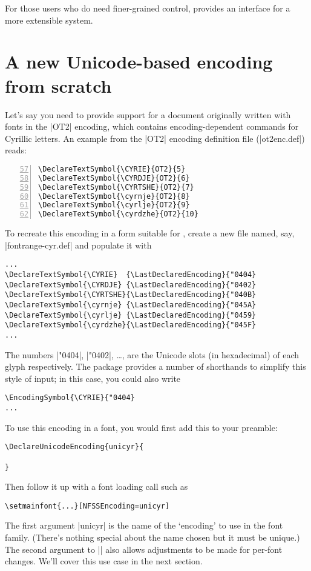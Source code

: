\documentclass[a4paper]{l3doc}
\begin{document}
For those users who do need finer-grained control,  provides an
interface for a more extensible system.


\section{A new Unicode-based encoding from scratch}

Let's say you need to provide support for a document originally written with fonts
in the |OT2| encoding, which contains encoding-dependent commands for Cyrillic letters.
An example from the |OT2| encoding definition file (|ot2enc.def|) reads:
\begin{Verbatim}[numbers=left,firstnumber=57]
\DeclareTextSymbol{\CYRIE}{OT2}{5}
\DeclareTextSymbol{\CYRDJE}{OT2}{6}
\DeclareTextSymbol{\CYRTSHE}{OT2}{7}
\DeclareTextSymbol{\cyrnje}{OT2}{8}
\DeclareTextSymbol{\cyrlje}{OT2}{9}
\DeclareTextSymbol{\cyrdzhe}{OT2}{10}
\end{Verbatim}

To recreate this encoding in a form suitable for , create a new file
named, say, |fontrange-cyr.def| and populate it with
\begin{Verbatim}
...
\DeclareTextSymbol{\CYRIE}  {\LastDeclaredEncoding}{"0404}
\DeclareTextSymbol{\CYRDJE} {\LastDeclaredEncoding}{"0402}
\DeclareTextSymbol{\CYRTSHE}{\LastDeclaredEncoding}{"040B}
\DeclareTextSymbol{\cyrnje} {\LastDeclaredEncoding}{"045A}
\DeclareTextSymbol{\cyrlje} {\LastDeclaredEncoding}{"0459}
\DeclareTextSymbol{\cyrdzhe}{\LastDeclaredEncoding}{"045F}
...
\end{Verbatim}
The numbers |"0404|, |"0402|, \dots, are the Unicode slots (in hexadecimal)
of each glyph respectively.
The  package provides a number of shorthands to simplify this style of input; in this case,
you could also write
\begin{Verbatim}
\EncodingSymbol{\CYRIE}{"0404}
...
\end{Verbatim}

To use this encoding in a  font, you would first add this to your preamble:
\begin{Verbatim}
\DeclareUnicodeEncoding{unicyr}{
  
}
\end{Verbatim}
Then follow it up with a font loading call such as
\begin{Verbatim}
\setmainfont{...}[NFSSEncoding=unicyr]
\end{Verbatim}
The first argument |unicyr| is the name of the `encoding' to use in the
font family. (There's nothing special about the name chosen but it must be unique.)
The second argument to |\DeclareUnicodeEncoding| also allows adjustments to be made
for per-font changes.
We'll cover this use case in the next section.
\end{document}
